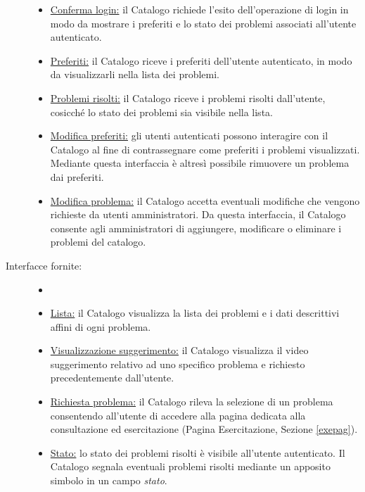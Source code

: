 \documentclass[11pt, a4paper]{article}
\theoremstyle{definition} %
\begin{document}
\begin{description}
\begin{itemize}
        \item \underline{Conferma login:} il Catalogo richiede l'esito dell'operazione di
        login in modo da mostrare i preferiti e lo stato dei problemi associati
        all'utente autenticato.

        \item \underline{Preferiti:} il Catalogo riceve i preferiti dell'utente autenticato,
        in modo da visualizzarli nella lista dei problemi.
        
        \item \underline{Problemi risolti:} il Catalogo riceve i problemi risolti dall'utente,
        cosicché lo stato dei problemi sia visibile nella lista.

        \item \underline{Modifica preferiti:} gli utenti autenticati possono interagire
        con il Catalogo al fine di contrassegnare come preferiti i problemi visualizzati.
        Mediante questa interfaccia è altresì possibile rimuovere un problema dai preferiti.

        \item \underline{Modifica problema:} il Catalogo accetta eventuali modifiche
        che vengono richieste da utenti amministratori. Da questa interfaccia, il
        Catalogo consente agli amministratori di aggiungere, modificare o eliminare
        i problemi del catalogo.
    \end{itemize}

    \item[Interfacce fornite:]
    \begin{itemize}
        \item[]
        
        \item \underline{Lista:} il Catalogo visualizza la lista dei problemi e i
        dati descrittivi affini di ogni problema.

        \item \underline{Visualizzazione suggerimento:} il Catalogo visualizza il
        video suggerimento relativo ad uno specifico problema e richiesto precedentemente
        dall'utente.

        \item \underline{Richiesta problema:} il Catalogo rileva la selezione di
        un problema consentendo all'utente di accedere alla pagina dedicata alla
        consultazione ed esercitazione (Pagina Esercitazione, Sezione \ref{exepag}).
        
        \item \underline{Stato:} lo stato dei problemi risolti è visibile all'utente
        autenticato. Il Catalogo segnala eventuali problemi risolti
        mediante un apposito simbolo in un campo \textit{stato}.


\end{itemize}
\end{description}
\end{document}

